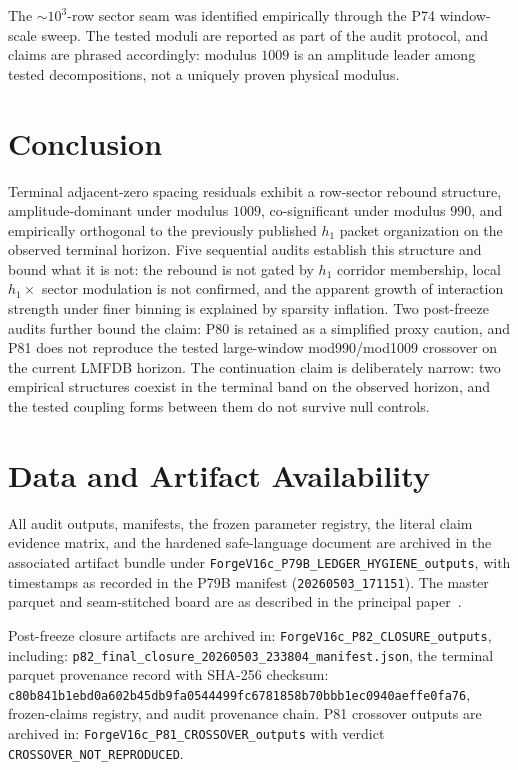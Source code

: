 \documentclass[11pt]{article}
\newcommand{\terminalsha}{c80b841b1ebd0a602b45db9fa0544499fc6781858b70bbb1ec0940aeffe0fa76}
\begin{document}
The $\sim10^3$-row sector seam was identified empirically through the
P74 window-scale sweep. The tested moduli are reported as part of the
audit protocol, and claims are phrased accordingly: modulus $1009$ is
an amplitude leader among tested decompositions, not a uniquely proven
physical modulus.

\section{Conclusion}

Terminal adjacent-zero spacing residuals exhibit a row-sector rebound
structure, amplitude-dominant under modulus $1009$, co-significant
under modulus $990$, and empirically orthogonal to the previously
published $h_1$ packet organization on the observed terminal horizon.
Five sequential audits establish this structure and bound what it is
not: the rebound is not gated by $h_1$ corridor membership, local
$h_1 \times$ sector modulation is not confirmed, and the apparent
growth of interaction strength under finer binning is explained by
sparsity inflation. Two post-freeze audits further bound the claim:
P80 is retained as a simplified proxy caution, and P81 does not
reproduce the tested large-window mod990/mod1009 crossover on the
current LMFDB horizon. The continuation claim is deliberately narrow:
two empirical structures coexist in the terminal band on the observed
horizon, and the tested coupling forms between them do not survive null
controls.

\section*{Data and Artifact Availability}

All audit outputs, manifests, the frozen parameter registry, the
literal claim evidence matrix, and the hardened safe-language document
are archived in the associated artifact bundle under
\texttt{ForgeV16c\_P79B\_LEDGER\_HYGIENE\_outputs}, with timestamps as
recorded in the P79B manifest (\texttt{20260503\_171151}). The master
parquet and seam-stitched board are as described in the principal
paper~\cite{huckstead_h1_principal}.

Post-freeze closure artifacts are archived in:
\newline
\texttt{ForgeV16c\_P82\_CLOSURE\_outputs},
\newline
including:
\newline
\texttt{p82\_final\_closure\_20260503\_233804\_manifest.json},
\newline
the terminal parquet provenance record with SHA-256 checksum:
\newline
\texttt{\terminalsha},
\newline
frozen-claims registry, and audit provenance
chain. P81 crossover outputs are archived in:
\newline
\texttt{ForgeV16c\_P81\_CROSSOVER\_outputs} with verdict
\texttt{CROSSOVER\_NOT\_REPRODUCED}.
\end{document}

